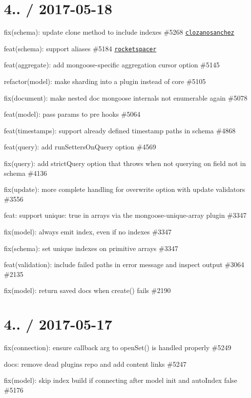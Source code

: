 \section*{4.. / 2017-\/05-\/18 }


\begin{DoxyItemize}
\item fix(schema)\+: update clone method to include indexes \#5268 \href{https://github.com/clozanosanchez}{\tt clozanosanchez}
\item feat(schema)\+: support aliases \#5184 \href{https://github.com/rocketspacer}{\tt rocketspacer}
\item feat(aggregate)\+: add mongoose-\/specific aggregation cursor option \#5145
\item refactor(model)\+: make sharding into a plugin instead of core \#5105
\item fix(document)\+: make nested doc mongoose internals not enumerable again \#5078
\item feat(model)\+: pass params to pre hooks \#5064
\item feat(timestamps)\+: support already defined timestamp paths in schema \#4868
\item feat(query)\+: add run\+Setters\+On\+Query option \#4569
\item fix(query)\+: add strict\+Query option that throws when not querying on field not in schema \#4136
\item fix(update)\+: more complete handling for overwrite option with update validators \#3556
\item feat\+: support {\ttfamily unique\+: true} in arrays via the mongoose-\/unique-\/array plugin \#3347
\item fix(model)\+: always emit \textquotesingle{}index\textquotesingle{}, even if no indexes \#3347
\item fix(schema)\+: set unique indexes on primitive arrays \#3347
\item feat(validation)\+: include failed paths in error message and inspect output \#3064 \#2135
\item fix(model)\+: return saved docs when create() fails \#2190
\end{DoxyItemize}

\section*{4.. / 2017-\/05-\/17 }


\begin{DoxyItemize}
\item fix(connection)\+: ensure callback arg to open\+Set() is handled properly \#5249
\item docs\+: remove dead plugins repo and add content links \#5247
\item fix(model)\+: skip index build if connecting after model init and auto\+Index false \#5176
\end{DoxyItemize}

